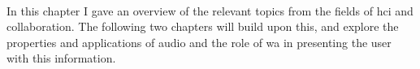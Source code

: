 \paragraph[Bridge]{}
In this chapter I gave an overview of the relevant topics from the fields of \gls{hci} and collaboration. The following two chapters will build upon this, and explore the properties and applications of audio and the role of \gls{wa} in presenting the user with this information.

